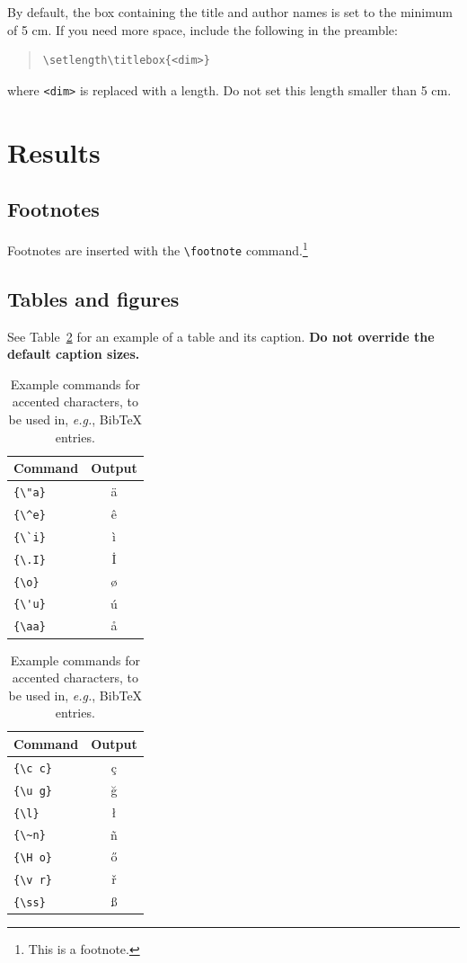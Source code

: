 \documentclass[11pt]{article}
\begin{document}
By default, the box containing the title and author names is set to the minimum of 5 cm. If you need more space, include the following in the preamble:
\begin{quote}
\begin{verbatim}
\setlength\titlebox{<dim>}
\end{verbatim}
\end{quote}
where \verb|<dim>| is replaced with a length. Do not set this length smaller than 5 cm.

\section{Results}

\subsection{Footnotes}

Footnotes are inserted with the \verb|\footnote| command.\footnote{This is a footnote.}

\subsection{Tables and figures}

See Table~\ref{tab:accents} for an example of a table and its caption.
\textbf{Do not override the default caption sizes.}

\begin{table}
  \centering
  \begin{tabular}{lc}
    \hline
    \textbf{Command} & \textbf{Output} \\
    \hline
    \verb|{\"a}|     & {\"a}           \\
    \verb|{\^e}|     & {\^e}           \\
    \verb|{\`i}|     & {\`i}           \\
    \verb|{\.I}|     & {\.I}           \\
    \verb|{\o}|      & {\o}            \\
    \verb|{\'u}|     & {\'u}           \\
    \verb|{\aa}|     & {\aa}           \\\hline
  \end{tabular}
  \begin{tabular}{lc}
    \hline
    \textbf{Command} & \textbf{Output} \\
    \hline
    \verb|{\c c}|    & {\c c}          \\
    \verb|{\u g}|    & {\u g}          \\
    \verb|{\l}|      & {\l}            \\
    \verb|{\~n}|     & {\~n}           \\
    \verb|{\H o}|    & {\H o}          \\
    \verb|{\v r}|    & {\v r}          \\
    \verb|{\ss}|     & {\ss}           \\
    \hline
  \end{tabular}
  \caption{Example commands for accented characters, to be used in, \emph{e.g.}, Bib\TeX{} entries.}
  \label{tab:accents}
\end{table}
\end{document}
